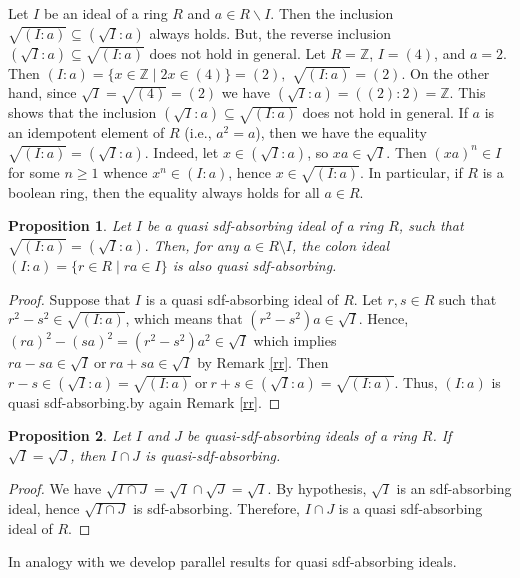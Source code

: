 \documentclass{amsart}%
\newtheorem{proposition}{Proposition}[section]
\begin{document}
Let $I$ be an ideal of a ring $R$ and $a\in R\backslash I$. Then the inclusion
$\sqrt{(I:a)}\subseteq(\sqrt{I}:a)$ always holds. But, the reverse inclusion
$(\sqrt{I}:a)\subseteq\sqrt{(I:a)}$ does not hold in general. Let
$R=\mathbb{Z}$, $I=(4)$, and $a=2$. Then $(I:a)=\{x\in\mathbb{Z}\mid
2x\in(4)\}=(2),$ $\sqrt{(I:a)}=(2)$. On the other hand, since $\sqrt{I}%
=\sqrt{(4)}=(2)$ we have $(\sqrt{I}:a)=((2):2)=\mathbb{Z}.$ This shows that
the inclusion $(\sqrt{I}:a)\subseteq\sqrt{(I:a)}$ does not hold in general. If
$a$ is an idempotent element of $R$ (i.e., $a^{2}=a$), then we have the
equality $\sqrt{(I:a)}=(\sqrt{I}:a)$. Indeed, let $x\in(\sqrt{I}:a)$, so
$xa\in\sqrt{I}$. Then $(xa)^{n}\in I$ for some $n\geq1$ whence $x^{n}\in
(I:a)$, hence $x\in\sqrt{(I:a)}$. In particular, if $R$ is a boolean ring,
then the equality always holds for all $a\in R$.

\begin{proposition}
Let $I$ be a quasi sdf-absorbing ideal of a ring $R$, such that $\sqrt
{(I:a)}=(\sqrt{I}:a).$ Then, for any $a\in R\setminus I$, the colon ideal
$(I:a)=\{r\in R\mid ra\in I\}$ is also quasi sdf-absorbing.
\end{proposition}

\begin{proof}
Suppose that $I$ is a quasi sdf-absorbing ideal of $R$. Let $r,s\in R$ such
that $r^{2}-s^{2}\in\sqrt{(I:a)}$, which means that $(r^{2}-s^{2})a\in\sqrt
{I}.$ Hence, $(ra)^{2}-(sa)^{2}=(r^{2}-s^{2})a^{2}\in\sqrt{I}$ which implies
$ra-sa\in\sqrt{I}\ \text{or}\ ra+sa\in\sqrt{I}$ by Remark \ref{rr}. Then
$r-s\in(\sqrt{I}:a)=\sqrt{(I:a)}\ \text{or}\ r+s\in(\sqrt{I}:a)=\sqrt{(I:a)}.$
Thus, $(I:a)$ is quasi sdf-absorbing.by again Remark \ref{rr}.
\end{proof}

\begin{proposition}
Let $I$ and $J$ be quasi-sdf-absorbing ideals of a ring $R$. If $\sqrt
{I}=\sqrt{J}$, then $I\cap J$ is quasi-sdf-absorbing.
\end{proposition}

\begin{proof}
We have $\sqrt{I\cap J}=\sqrt{I}\cap\sqrt{J}=\sqrt{I}$. By hypothesis,
$\sqrt{I}$ is an sdf-absorbing ideal, hence $\sqrt{I\cap J}$ is sdf-absorbing.
Therefore, $I\cap J$ is a quasi sdf-absorbing ideal of $R$.
\end{proof}

In analogy with \cite[Theorem 4.12]{AB2024} we develop parallel results for
quasi sdf-absorbing ideals.
\end{document}
